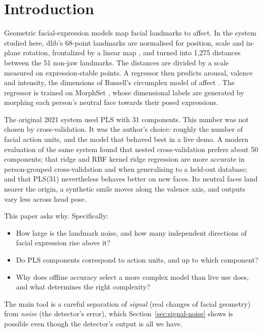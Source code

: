 \documentclass[11pt,a4paper]{article}
\begin{document}
\section{Introduction}

Geometric facial-expression models map facial landmarks to affect. In the system studied here,
dlib's 68-point landmarks \citep{kazemi2014one} are normalised for position, scale and in-plane
rotation, frontalized by a linear map \citep{vonikakis2020frontalization}, and turned into 1,275
distances between the 51 non-jaw landmarks. The distances are divided by a scale measured on
expression-stable points. A regressor then predicts arousal, valence and intensity, the
dimensions of Russell's circumplex model of affect \citep{russell1980circumplex,
vonikakis2021efficient}. The regressor is trained on MorphSet \citep{vonikakis2021morphset}, whose
dimensional labels are generated by morphing each person's neutral face towards their posed
expressions.

The original 2021 system used PLS \citep{wold2001pls} with 31 components. This number was not
chosen by cross-validation. It was the author's choice: roughly the number of facial action
units, and the model that behaved best in a live demo. A modern evaluation of the same system
found that nested cross-validation prefers about 50 components; that ridge and RBF kernel ridge
regression are more accurate in person-grouped cross-validation and when generalising to a
held-out database; and that PLS(31) nevertheless behaves better on new faces. Its neutral faces
land nearer the origin, a synthetic smile moves along the valence axis, and outputs vary less
across head pose.

This paper asks why. Specifically:
\begin{itemize}
  \item[\textbf{Q1}] How large is the landmark noise, and how many independent directions of
  facial expression rise above it?
  \item[\textbf{Q2}] Do PLS components correspond to action units, and up to which component?
  \item[\textbf{Q3}] Why does offline accuracy select a more complex model than live use does,
  and what determines the right complexity?
\end{itemize}
The main tool is a careful separation of \emph{signal} (real changes of facial geometry) from
\emph{noise} (the detector's error), which Section~\ref{sec:signal-noise} shows is possible even
though the detector's output is all we have.
\end{document}
